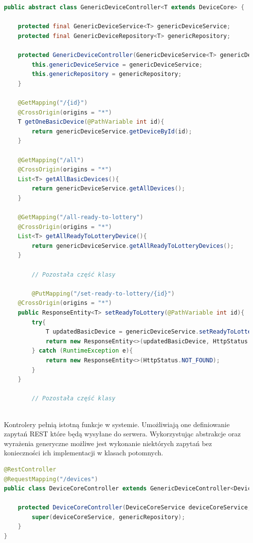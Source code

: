 \begin{lstlisting}[language=Java, style=JavaStyle,  caption={Klasa nadrzędna kontrolera sprzętu: GenericDeviceController}, label={controller_genericDevice}]
public abstract class GenericDeviceController<T extends DeviceCore> {

    protected final GenericDeviceService<T> genericDeviceService;
    protected final GenericDeviceRepository<T> genericRepository;

    protected GenericDeviceController(GenericDeviceService<T> genericDeviceService, GenericDeviceRepository<T> genericRepository) {
        this.genericDeviceService = genericDeviceService;
        this.genericRepository = genericRepository;
    }

    @GetMapping("/{id}")
    @CrossOrigin(origins = "*")
    T getOneBasicDevice(@PathVariable int id){
        return genericDeviceService.getDeviceById(id);
    }

    @GetMapping("/all")
    @CrossOrigin(origins = "*")
    List<T> getAllBasicDevices(){
        return genericDeviceService.getAllDevices();
    }

    @GetMapping("/all-ready-to-lottery")
    @CrossOrigin(origins = "*")
    List<T> getAllReadyToLotteryDevice(){
        return genericDeviceService.getAllReadyToLotteryDevices();
    }
		
		// Pozostała część klasy
		
		@PutMapping("/set-ready-to-lottery/{id}")
    @CrossOrigin(origins = "*")
    public ResponseEntity<T> setReadyToLottery(@PathVariable int id){
        try{
            T updatedBasicDevice = genericDeviceService.setReadyToLottery(id);
            return new ResponseEntity<>(updatedBasicDevice, HttpStatus.OK);
        } catch (RuntimeException e){
            return new ResponseEntity<>(HttpStatus.NOT_FOUND);
        }
    }
		
		// Pozostała część klasy
		
\end{lstlisting}

Kontrolery pełnią istotną funkcje w systemie. Umożliwiają one definiowanie zapytań REST które będą wysyłane do serwera. Wykorzystując abstrakcje oraz wyrażenia generyczne możliwe jest wykonanie niektórych zapytań bez konieczności ich implementacji w klasach potomnych.


\begin{lstlisting}[language=Java, style=JavaStyle,  caption={Klasa potomna reprezentująca ogólną postać sprzętu}, label={controller_device}]
@RestController
@RequestMapping("/devices")
public class DeviceCoreController extends GenericDeviceController<DeviceCore>{

    protected DeviceCoreController(DeviceCoreService deviceCoreService, GenericDeviceRepository<DeviceCore> genericRepository) {
        super(deviceCoreService, genericRepository);
    }
}
\end{lstlisting}

